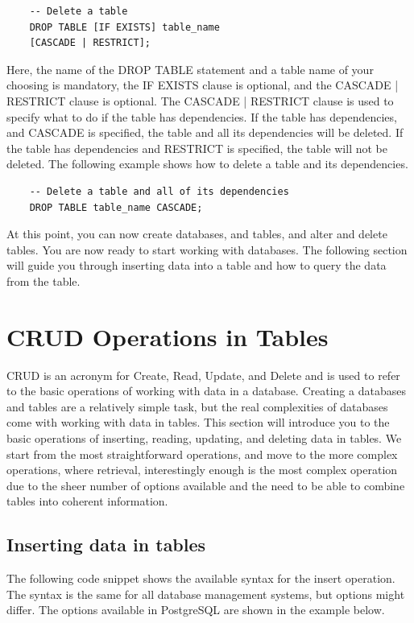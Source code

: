 \begin{verbatim}
    -- Delete a table
    DROP TABLE [IF EXISTS] table_name 
    [CASCADE | RESTRICT];
\end{verbatim}

Here, the name of the DROP TABLE statement and a table name of your choosing is mandatory, the IF EXISTS clause is optional, and the CASCADE | RESTRICT clause is optional. The CASCADE | RESTRICT clause is used to specify what to do if the table has dependencies. If the table has dependencies, and CASCADE is specified, the table and all its dependencies will be deleted. If the table has dependencies and RESTRICT is specified, the table will not be deleted. The following example shows how to delete a table and its dependencies.

\begin{verbatim}
    -- Delete a table and all of its dependencies
    DROP TABLE table_name CASCADE;
\end{verbatim}

At this point, you can now create databases, and tables, and alter and delete tables. You are now ready to start working with databases. The following section will guide you through inserting data into a table and how to query the data from the table.

\section{CRUD Operations in Tables}
CRUD is an acronym for Create, Read, Update, and Delete and is used to refer to the basic operations of working with data in a database. Creating a databases and tables are a relatively simple task, but the real complexities of databases come with working with data in tables. This section will introduce you to the basic operations of inserting, reading, updating, and deleting data in tables. We start from the most straightforward operations, and move to the more complex operations, where retrieval, interestingly enough is the most complex operation due to the sheer number of options available and the need to be able to combine tables into coherent information.

\subsection{Inserting data in tables}
The following code snippet shows the available syntax for the insert operation. The syntax is the same for all database management systems, but options might differ. The options available in PostgreSQL are shown in the example below.

